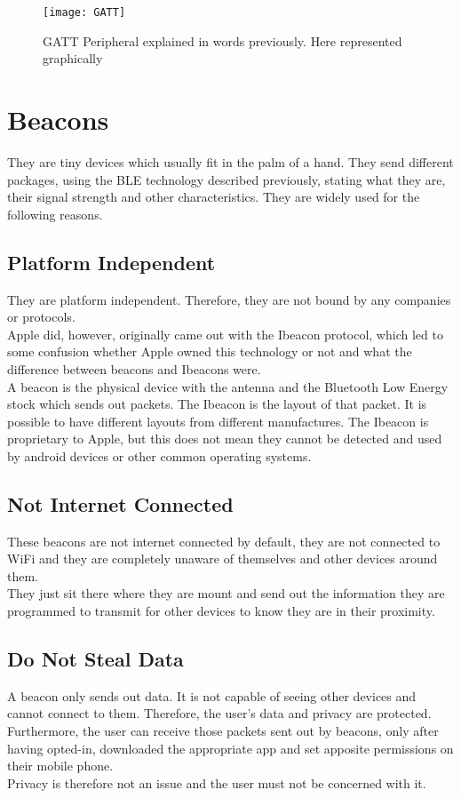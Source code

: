 	\begin{figure}[h!]
		\texttt{[image: GATT]}
		\caption{GATT Peripheral explained in words previously. Here represented graphically}
		\label{fig:GattPeripheral}
	\end{figure}


\section{Beacons}
They are tiny devices which usually fit in the palm of a hand. They send different packages, using the BLE technology described previously, stating what they are, their signal strength and other characteristics. They are widely used for the following reasons.\\
\subsection{Platform Independent}
They are platform independent. Therefore, they are not bound by any companies or protocols.\\ 
Apple did, however, originally came out with the Ibeacon protocol, which led to some confusion whether Apple owned this technology or not and what the difference between beacons and Ibeacons were.\\
A beacon is the physical device with the antenna and the Bluetooth Low Energy stock which sends out packets. The Ibeacon is the layout of that packet. It is possible to have different layouts from different manufactures.
The Ibeacon is proprietary to Apple, but this does not mean they cannot be detected and used by android devices or other common operating systems.\\
\subsection{Not Internet Connected}
These beacons are not internet connected by default, they are not connected to WiFi and they are completely unaware of themselves and other devices around them.\\
They just sit there where they are mount and send out the information they are programmed to transmit for other devices to know they are in their proximity.\\
\subsection{Do Not Steal Data}
A beacon only sends out data. It is not capable of seeing other devices and cannot connect to them. Therefore, the user’s data and privacy are protected.\\
Furthermore, the user can receive those packets sent out by beacons, only after having opted-in, downloaded the appropriate app and set apposite permissions on their mobile phone.\\
Privacy is therefore not an issue and the user must not be concerned with it.\\
